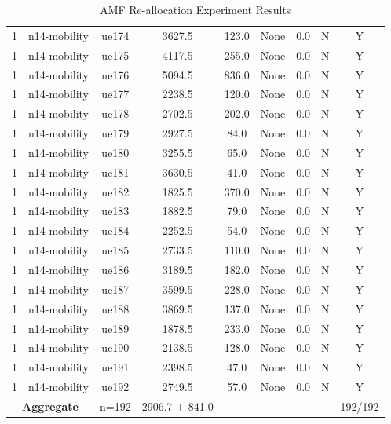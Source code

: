 \begin{table}[ht]
\begin{tabular}{|c|c|c|c|c|c|c|c|c|}
1 & n14-mobility & ue174 & 3627.5 & 123.0 & None & 0.0 & N & Y \\
1 & n14-mobility & ue175 & 4117.5 & 255.0 & None & 0.0 & N & Y \\
1 & n14-mobility & ue176 & 5094.5 & 836.0 & None & 0.0 & N & Y \\
1 & n14-mobility & ue177 & 2238.5 & 120.0 & None & 0.0 & N & Y \\
1 & n14-mobility & ue178 & 2702.5 & 202.0 & None & 0.0 & N & Y \\
1 & n14-mobility & ue179 & 2927.5 & 84.0 & None & 0.0 & N & Y \\
1 & n14-mobility & ue180 & 3255.5 & 65.0 & None & 0.0 & N & Y \\
1 & n14-mobility & ue181 & 3630.5 & 41.0 & None & 0.0 & N & Y \\
1 & n14-mobility & ue182 & 1825.5 & 370.0 & None & 0.0 & N & Y \\
1 & n14-mobility & ue183 & 1882.5 & 79.0 & None & 0.0 & N & Y \\
1 & n14-mobility & ue184 & 2252.5 & 54.0 & None & 0.0 & N & Y \\
1 & n14-mobility & ue185 & 2733.5 & 110.0 & None & 0.0 & N & Y \\
1 & n14-mobility & ue186 & 3189.5 & 182.0 & None & 0.0 & N & Y \\
1 & n14-mobility & ue187 & 3599.5 & 228.0 & None & 0.0 & N & Y \\
1 & n14-mobility & ue188 & 3869.5 & 137.0 & None & 0.0 & N & Y \\
1 & n14-mobility & ue189 & 1878.5 & 233.0 & None & 0.0 & N & Y \\
1 & n14-mobility & ue190 & 2138.5 & 128.0 & None & 0.0 & N & Y \\
1 & n14-mobility & ue191 & 2398.5 & 47.0 & None & 0.0 & N & Y \\
1 & n14-mobility & ue192 & 2749.5 & 57.0 & None & 0.0 & N & Y \\
\multicolumn{2}{|c|}{\textbf{Aggregate}} & n=192 & 2906.7 $\pm$ 841.0 & -- & -- & -- & -- & 192/192 \\
\hline
\end{tabular}
\caption{AMF Re-allocation Experiment Results}
\label{tab:amf_realloc}
\end{table}
